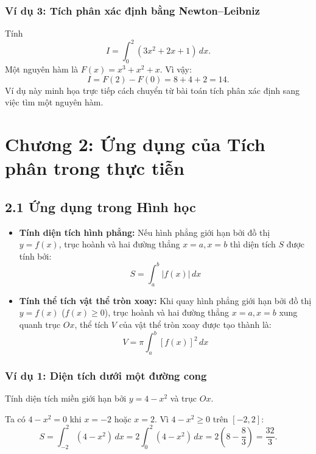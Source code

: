 \documentclass[12pt,a4paper]{article}
\begin{document}
\subsubsection*{Ví dụ 3: Tích phân xác định bằng Newton--Leibniz}
Tính
\[
I=\int_0^2(3x^2+2x+1)\,dx.
\]
Một nguyên hàm là $F(x)=x^3+x^2+x$. Vì vậy:
\[
I=F(2)-F(0)=8+4+2=14.
\]
Ví dụ này minh họa trực tiếp cách chuyển từ bài toán tích phân xác định sang việc tìm một nguyên hàm.

\section{Chương 2: Ứng dụng của Tích phân trong thực tiễn}

\subsection{2.1 Ứng dụng trong Hình học}
\begin{itemize}
    \item \textbf{Tính diện tích hình phẳng:} Nếu hình phẳng giới hạn bởi đồ thị $y = f(x)$, trục hoành và hai đường thẳng $x = a, x = b$ thì diện tích $S$ được tính bởi:
    \begin{equation}
    S = \int_{a}^{b} |f(x)| \, dx
    \end{equation}
    \item \textbf{Tính thể tích vật thể tròn xoay:} Khi quay hình phẳng giới hạn bởi đồ thị $y = f(x)$ ($f(x) \ge 0$), trục hoành và hai đường thẳng $x = a, x = b$ xung quanh trục $Ox$, thể tích $V$ của vật thể tròn xoay được tạo thành là:
    \begin{equation}
    V = \pi \int_{a}^{b} [f(x)]^2 \, dx
    \end{equation}
\end{itemize}

\subsubsection*{Ví dụ 1: Diện tích dưới một đường cong}
Tính diện tích miền giới hạn bởi $y=4-x^2$ và trục $Ox$.

\begin{center}
\end{center}
Ta có $4-x^2=0$ khi $x=-2$ hoặc $x=2$. Vì $4-x^2\geq0$ trên $[-2,2]$:
\[
S=\int_{-2}^{2}(4-x^2)\,dx
=2\int_0^2(4-x^2)\,dx
=2\left(8-\frac{8}{3}\right)
=\frac{32}{3}.
\]
\end{document}
